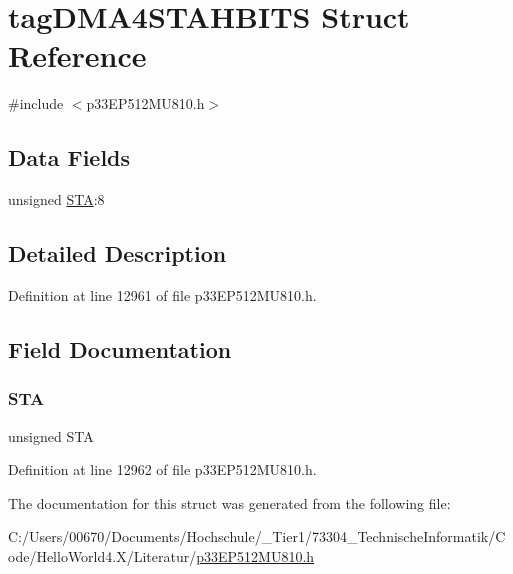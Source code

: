 \hypertarget{structtag_d_m_a4_s_t_a_h_b_i_t_s}{}\section{tag\+D\+M\+A4\+S\+T\+A\+H\+B\+I\+TS Struct Reference}
\label{structtag_d_m_a4_s_t_a_h_b_i_t_s}


{\ttfamily \#include $<$p33\+E\+P512\+M\+U810.\+h$>$}

\subsection*{Data Fields}
\begin{DoxyCompactItemize}
\item 
unsigned \hyperlink{structtag_d_m_a4_s_t_a_h_b_i_t_s_a0eec78ddd2c12af678d5fab70fe62d14}{S\+TA}\+:8
\end{DoxyCompactItemize}


\subsection{Detailed Description}


Definition at line 12961 of file p33\+E\+P512\+M\+U810.\+h.



\subsection{Field Documentation}
\mbox{\label{structtag_d_m_a4_s_t_a_h_b_i_t_s_a0eec78ddd2c12af678d5fab70fe62d14}} 
\subsubsection{\texorpdfstring{S\+TA}{STA}}
{\footnotesize\ttfamily unsigned S\+TA}



Definition at line 12962 of file p33\+E\+P512\+M\+U810.\+h.



The documentation for this struct was generated from the following file\+:\begin{DoxyCompactItemize}
\item 
C\+:/\+Users/00670/\+Documents/\+Hochschule/\+\_\+\+Tier1/73304\+\_\+\+Technische\+Informatik/\+Code/\+Hello\+World4.\+X/\+Literatur/\hyperlink{p33_e_p512_m_u810_8h}{p33\+E\+P512\+M\+U810.\+h}\end{DoxyCompactItemize}
